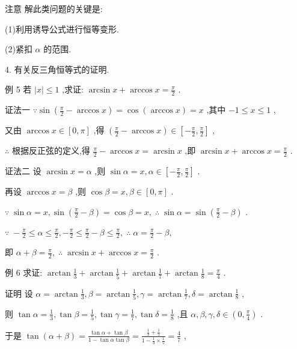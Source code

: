 \documentclass[10pt]{article}
\begin{document}
注意 解此类问题的关键是:

(1)利用诱导公式进行恒等变形.

(2)紧扣 \(\alpha\) 的范围.

4. 有关反三角恒等式的证明.

例 5 若 \(\left| x\right|  \leq  1\) ,求证: \(\arcsin x + \arccos x = \frac{\pi }{2}\) .

证法一 \(\because \sin \left( {\frac{\pi }{2} - \arccos x}\right)  = \cos \left( {\arccos x}\right)  = x\) ,其中 \(- 1 \leq  x \leq  1\) ,

又由 \(\arccos x \in  \left\lbrack  {0,\pi }\right\rbrack\) ,得 \(\left( {\frac{\pi }{2} - \arccos x}\right)  \in  \left\lbrack  {-\frac{\pi }{2},\frac{\pi }{2}}\right\rbrack\) ,

\(\therefore\) 根据反正弦的定义,得 \(\frac{\pi }{2} - \arccos x = \arcsin x\) ,即 \(\arcsin x + \arccos x = \frac{\pi }{2}\) .

证法二 设 \(\arcsin x = \alpha\) ,则 \(\sin \alpha  = x,\alpha  \in  \left\lbrack  {-\frac{\pi }{2},\frac{\pi }{2}}\right\rbrack\) .

再设 \(\arccos x = \beta\) ,则 \(\cos \beta  = x,\beta  \in  \left\lbrack  {0,\pi }\right\rbrack\) .

\(\because \;\sin \alpha  = x,\sin \left( {\frac{\pi }{2} - \beta }\right)  = \cos \beta  = x,\;\therefore \;\sin \alpha  = \sin \left( {\frac{\pi }{2} - \beta }\right)\) .

\(\because \; - \frac{\pi }{2} \leq  \alpha  \leq  \frac{\pi }{2}, - \frac{\pi }{2} \leq  \frac{\pi }{2} - \beta  \leq  \frac{\pi }{2},\;\therefore \;\alpha  = \frac{\pi }{2} - \beta ,\)

即 \(\alpha  + \beta  = \frac{\pi }{2},\;\therefore \;\arcsin x + \arccos x = \frac{\pi }{2}\) .

例 6 求证: \(\arctan \frac{1}{3} + \arctan \frac{1}{5} + \arctan \frac{1}{7} + \arctan \frac{1}{8} = \frac{\pi }{4}\) .

证明 设 \(\alpha  = \arctan \frac{1}{3},\beta  = \arctan \frac{1}{5},\gamma  = \arctan \frac{1}{7},\delta  = \arctan \frac{1}{8}\) ,

则 \(\tan \alpha  = \frac{1}{3},\tan \beta  = \frac{1}{5},\tan \gamma  = \frac{1}{7},\tan \delta  = \frac{1}{8}\) ,且 \(\alpha ,\beta ,\gamma ,\delta  \in  \left( {0,\frac{\pi }{4}}\right)\) .

于是 \(\tan \left( {\alpha  + \beta }\right)  = \frac{\tan \alpha  + \tan \beta }{1 - \tan \alpha \tan \beta } = \frac{\frac{1}{3} + \frac{1}{5}}{1 - \frac{1}{3} \times  \frac{1}{5}} = \frac{4}{7}\) ,
\end{document}
